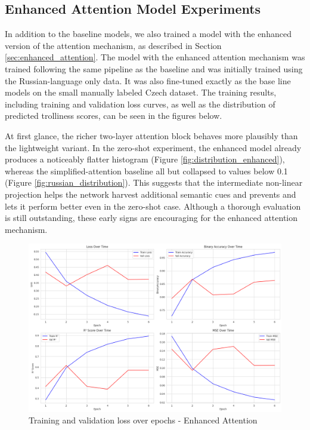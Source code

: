 \documentclass[twoside]{ctuthesis}
\theoremstyle{plain}
\theoremstyle{definition}
\theoremstyle{note}
\begin{document}
\subsection{Enhanced Attention Model Experiments}

In addition to the baseline models, we also trained a model with the enhanced version of the attention mechanism, as described in Section \ref{sec:enhanced_attention}. The model with the enhanced attention mechanism was trained following the same pipeline as the baseline and was initially trained using the Russian-language only data. It was also fine-tuned exactly as the base line models on the small manually labeled Czech dataset. The training results, including training and validation loss curves, as well as the distribution of predicted trolliness scores, can be seen in the figures below.\par 

At first glance, the richer two-layer attention block behaves more plausibly than the lightweight variant. In the zero-shot experiment, the enhanced model already produces a noticeably flatter histogram (Figure \ref{fig:distribution_enhanced}), whereas the simplified-attention baseline all but collapsed to values below 0.1 (Figure \ref{fig:russian_distribution}). This suggests that the intermediate non-linear projection helps the network harvest additional semantic cues and prevents and lets it perform better even in the zero-shot case. Although a thorough evaluation is still outstanding, these early signs are encouraging for the enhanced attention mechanism.\par

\begin{figure}[htbp]
  \centering
  \includegraphics[scale=0.33]{figures/training_enhanced.png}
  \caption{Training and validation loss over epochs - Enhanced Attention}
  \label{fig:training_stats_enhanced}
\end{figure}
\end{document}

